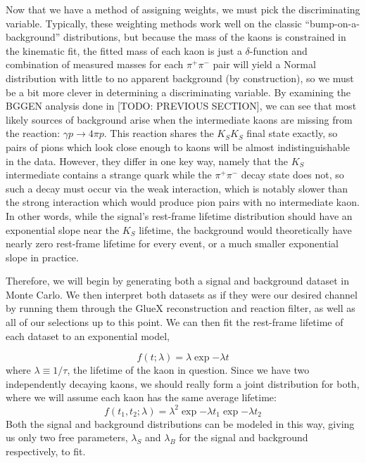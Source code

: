 Now that we have a method of assigning weights, we must pick the discriminating variable. Typically, these weighting methods work well on the classic ``bump-on-a-background'' distributions, but because the mass of the kaons is constrained in the kinematic fit, the fitted mass of each kaon is just a $\delta$-function and combination of measured masses for each $\pi^+\pi^-$ pair will yield a Normal distribution with little to no apparent background (by construction), so we must be a bit more clever in determining a discriminating variable. By examining the BGGEN analysis done in {\color{red}[TODO: PREVIOUS SECTION]}, we can see that most likely sources of background arise when the intermediate kaons are missing from the reaction: $\gamma p \to 4\pi p$. This reaction shares the $K_SK_S$ final state exactly, so pairs of pions which look close enough to kaons will be almost indistinguishable in the data. However, they differ in one key way, namely that the $K_S$ intermediate contains a strange quark while the $\pi^+\pi^-$ decay state does not, so such a decay must occur via the weak interaction, which is notably slower than the strong interaction which would produce pion pairs with no intermediate kaon. In other words, while the signal's rest-frame lifetime distribution should have an exponential slope near the $K_S$ lifetime, the background would theoretically have nearly zero rest-frame lifetime for every event, or a much smaller exponential slope in practice.

Therefore, we will begin by generating both a signal and background dataset in Monte Carlo. We then interpret both datasets as if they were our desired channel by running them through the GlueX reconstruction and reaction filter, as well as all of our selections up to this point. We can then fit the rest-frame lifetime of each dataset to an exponential model,

\begin{equation}
  f(t; \lambda) = \lambda \exp{-\lambda t}
  \label{eq:splot:exponential}
\end{equation}
where $\lambda \equiv 1/\tau$, the lifetime of the kaon in question. Since we have two independently decaying kaons, we should really form a joint distribution for both, where we will assume each kaon has the same average lifetime:
\begin{equation}
  f(t_1, t_2; \lambda) = \lambda^2 \exp{-\lambda t_1}\exp{-\lambda t_2}
  \label{eq:splot:exponential_joint}
\end{equation}
Both the signal and background distributions can be modeled in this way, giving us only two free parameters, $\lambda_S$ and $\lambda_B$ for the signal and background respectively, to fit.


